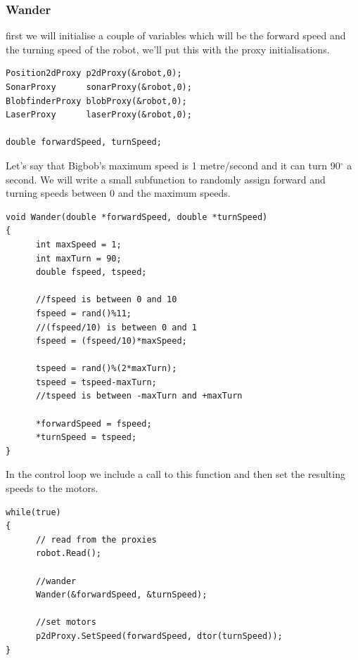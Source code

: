 \documentclass[a4paper]{article}
\begin{document}
\subsubsection{Wander}

first we will initialise a couple of variables which will be the forward speed and the turning speed of the robot, we'll put this with the proxy initialisations.
\begin{verbatim}
Position2dProxy p2dProxy(&robot,0);
SonarProxy      sonarProxy(&robot,0);
BlobfinderProxy blobProxy(&robot,0);
LaserProxy      laserProxy(&robot,0);

double forwardSpeed, turnSpeed;
\end{verbatim}

Let's say that Bigbob's maximum speed is 1 metre/second and it can turn 90$^\circ$ a second. We will write a small subfunction to randomly assign forward and turning speeds between 0 and the maximum speeds.
\begin{verbatim}
void Wander(double *forwardSpeed, double *turnSpeed)
{
      int maxSpeed = 1;
      int maxTurn = 90;
      double fspeed, tspeed;
	
      //fspeed is between 0 and 10
      fspeed = rand()%11;
      //(fspeed/10) is between 0 and 1
      fspeed = (fspeed/10)*maxSpeed;
	
      tspeed = rand()%(2*maxTurn);
      tspeed = tspeed-maxTurn;
      //tspeed is between -maxTurn and +maxTurn
	
      *forwardSpeed = fspeed;
      *turnSpeed = tspeed;
} 
\end{verbatim}
In the control loop we include a call to this function and then set the resulting speeds to the motors.
\begin{verbatim}
while(true)
{		
      // read from the proxies
      robot.Read();

      //wander
      Wander(&forwardSpeed, &turnSpeed);

      //set motors
      p2dProxy.SetSpeed(forwardSpeed, dtor(turnSpeed));
}
\end{verbatim}
\end{document}
